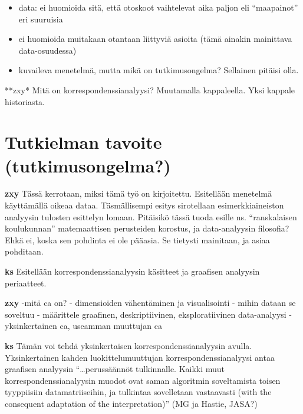 \documentclass[
  finnish,
]{book}
\begin{document}
\begin{itemize}
\item
  data: ei huomioida sitä, että otoskoot vaihtelevat aika paljon eli
  ``maapainot'' eri suuruisia
\item
  ei huomioida muitakaan otantaan liittyviä asioita (tämä ainakin
  mainittava data-osuudessa)
\item
  kuvaileva menetelmä, mutta mikä on tutkimusongelma? Sellainen pitäisi olla.
\end{itemize}

**zxy* Mitä on korrespondenssianalyysi? Muutamalla kappaleella. Yksi kappale
historiasta.

\hypertarget{tutkielman-tavoite-tutkimusongelma}{%
\section{Tutkielman tavoite (tutkimusongelma?)}\label{tutkielman-tavoite-tutkimusongelma}}

\textbf{zxy} Tässä kerrotaan, miksi tämä työ on kirjoitettu. Esitellään menetelmä
käyttämällä oikeaa dataa. Täsmällisempi esitys sirotellaan esimerkkiaineiston
analyysin tulosten esittelyn lomaan. Pitäisikö tässä tuoda esille ns. ``ranskalaisen
koulukunnan'' matemaattisen perusteiden korostus, ja data-analyysin filosofia?
Ehkä ei, koska sen pohdinta ei ole pääasia. Se tietysti mainitaan, ja asiaa pohditaan.

\textbf{ks} Esitellään korrespondenssianalyysin käsitteet ja graafisen analyysin
periaatteet.

\textbf{zxy} -mitä ca on?
- dimensioiden vähentäminen ja visualisointi
- mihin dataan se soveltuu
- määrittele graafinen, deskriptiivinen, eksploratiivinen data-analyysi
- yksinkertainen ca, useamman muuttujan ca

\textbf{ks} Tämän voi tehdä yksinkertaisen korrespondenssianalyysin avulla. Yksinkertainen
kahden luokittelumuuttujan korrespondenssianalyysi antaa graafisen analyysin
``\ldots perussäännöt tulkinnalle. Kaikki muut korrespondenssianalyysin muodot ovat
saman algoritmin soveltamista toisen tyyppiisiin datamatriiseihin, ja tulkintaa
sovelletaan vastaavasti (with the consequent adaptation of the interpretation)''
\citep[ , s. 437]{RefWorks:doc:5a857a44e4b0ed2d44664d84} (MG ja Hastie, JASA?)
\end{document}

